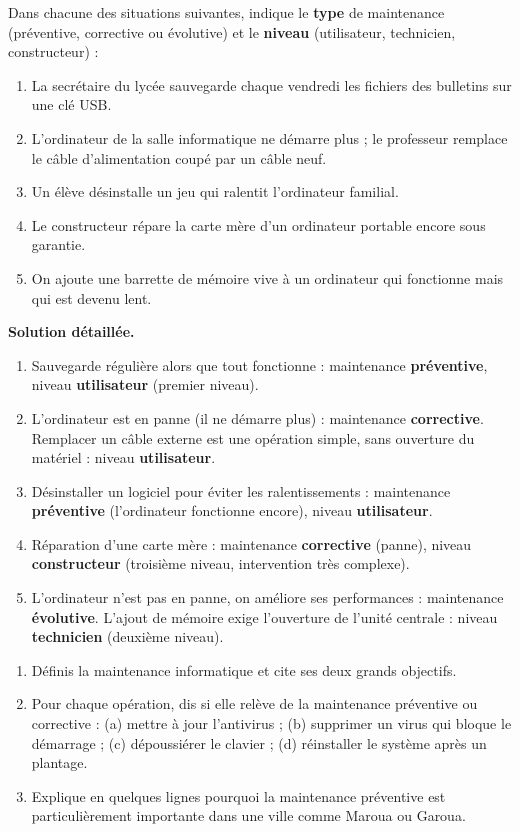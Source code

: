 \documentclass[11pt]{article}
\begin{document}
\begin{exoresolu}
Dans chacune des situations suivantes, indique le \textbf{type} de maintenance (préventive, corrective ou évolutive) et le \textbf{niveau} (utilisateur, technicien, constructeur) :
\begin{enumerate}
\item La secrétaire du lycée sauvegarde chaque vendredi les fichiers des bulletins sur une clé USB.
\item L'ordinateur de la salle informatique ne démarre plus ; le professeur remplace le câble d'alimentation coupé par un câble neuf.
\item Un élève désinstalle un jeu qui ralentit l'ordinateur familial.
\item Le constructeur répare la carte mère d'un ordinateur portable encore sous garantie.
\item On ajoute une barrette de mémoire vive à un ordinateur qui fonctionne mais qui est devenu lent.
\end{enumerate}
\tcblower
\textbf{Solution détaillée.}
\begin{enumerate}
\item Sauvegarde régulière alors que tout fonctionne : maintenance \textbf{préventive}, niveau \textbf{utilisateur} (premier niveau).
\item L'ordinateur est en panne (il ne démarre plus) : maintenance \textbf{corrective}. Remplacer un câble externe est une opération simple, sans ouverture du matériel : niveau \textbf{utilisateur}.
\item Désinstaller un logiciel pour éviter les ralentissements : maintenance \textbf{préventive} (l'ordinateur fonctionne encore), niveau \textbf{utilisateur}.
\item Réparation d'une carte mère : maintenance \textbf{corrective} (panne), niveau \textbf{constructeur} (troisième niveau, intervention très complexe).
\item L'ordinateur n'est pas en panne, on améliore ses performances : maintenance \textbf{évolutive}. L'ajout de mémoire exige l'ouverture de l'unité centrale : niveau \textbf{technicien} (deuxième niveau).
\end{enumerate}
\end{exoresolu}

\begin{exercice}
\begin{enumerate}
\item Définis la maintenance informatique et cite ses deux grands objectifs.
\item Pour chaque opération, dis si elle relève de la maintenance préventive ou corrective : (a) mettre à jour l'antivirus ; (b) supprimer un virus qui bloque le démarrage ; (c) dépoussiérer le clavier ; (d) réinstaller le système après un plantage.
\item Explique en quelques lignes pourquoi la maintenance préventive est particulièrement importante dans une ville comme Maroua ou Garoua.
\end{enumerate}
\end{exercice}
\end{document}
